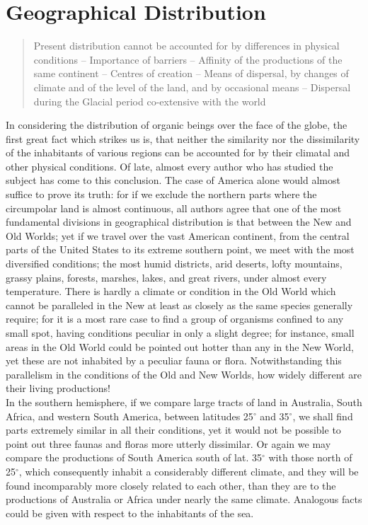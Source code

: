 \chapter{Geographical Distribution}

\begin{quotation}
	Present distribution cannot be accounted for by differences in physical conditions -- Importance of barriers -- Affinity of the productions of the same continent -- Centres of creation -- Means of dispersal, by changes of climate and of the level of the land, and by occasional means -- Dispersal during the Glacial period co-extensive with the world
\end{quotation}

\indent In considering the distribution of organic beings over the face of the globe, the first great fact which strikes us is, that neither the similarity nor the dissimilarity of the inhabitants of various regions can be accounted for by their climatal and other physical conditions. Of late, almost every author who has studied the subject has come to this conclusion.  The case of America alone would almost suffice to prove its truth: for if we exclude the northern parts where the circumpolar land is almost continuous, all authors agree that one of the most fundamental divisions in geographical distribution is that between the New and Old Worlds; yet if we travel over the vast American continent, from the central parts of the United States to its extreme southern point, we meet with the most diversified conditions; the most humid districts, arid deserts, lofty mountains, grassy plains, forests, marshes, lakes, and great rivers, under almost every temperature. There is hardly a climate or condition in the Old World which cannot be paralleled in the New at least as closely as the same species generally require; for it is a most rare case to find a group of organisms confined to any small spot, having conditions peculiar in only a slight degree; for instance, small areas in the Old World could be pointed out hotter than any in the New World, yet these are not inhabited by a peculiar fauna or flora. Notwithstanding this parallelism in the conditions of the Old and New Worlds, how widely different are their living productions!~\\
\indent In the southern hemisphere, if we compare large tracts of land in Australia, South Africa, and western South America, between latitudes 25$^{\circ}$ and 35$^{\circ}$, we shall find parts extremely similar in all their conditions, yet it would not be possible to point out three faunas and floras more utterly dissimilar. Or again we may compare the productions of South America south of lat. 35$^{\circ}$ with those north of 25$^{\circ}$, which consequently inhabit a considerably different climate, and they will be found incomparably more closely related to each other, than they are to the productions of Australia or Africa under nearly the same climate. Analogous facts could be given with respect to the inhabitants of the sea.~\\
